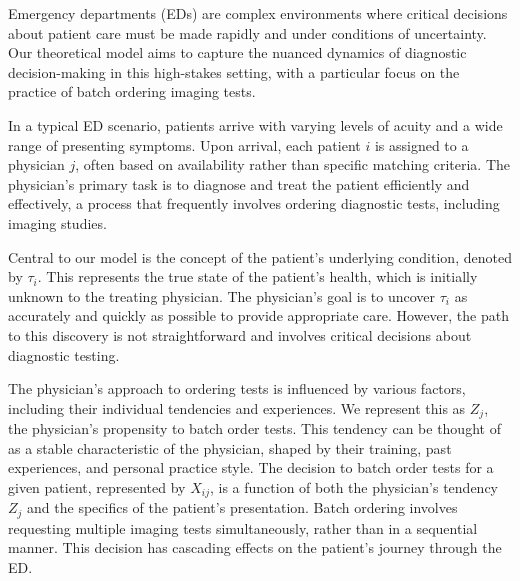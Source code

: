 \documentclass{article}
\begin{document}
Emergency departments (EDs) are complex environments where critical
decisions about patient care must be made rapidly and under conditions
of uncertainty. Our theoretical model aims to capture the nuanced
dynamics of diagnostic decision-making in this high-stakes setting, with
a particular focus on the practice of batch ordering imaging tests.

In a typical ED scenario, patients arrive with varying levels of acuity
and a wide range of presenting symptoms. Upon arrival, each patient
\(i\) is assigned to a physician \(j\), often based on availability
rather than specific matching criteria. The physician's primary task is
to diagnose and treat the patient efficiently and effectively, a process
that frequently involves ordering diagnostic tests, including imaging
studies.

Central to our model is the concept of the patient's underlying
condition, denoted by \(\tau_i\). This represents the true state of the
patient's health, which is initially unknown to the treating physician.
The physician's goal is to uncover \(\tau_i\) as accurately and quickly
as possible to provide appropriate care. However, the path to this
discovery is not straightforward and involves critical decisions about
diagnostic testing.

The physician's approach to ordering tests is influenced by various
factors, including their individual tendencies and experiences. We
represent this as \(Z_j\), the physician's propensity to batch order
tests. This tendency can be thought of as a stable characteristic of the
physician, shaped by their training, past experiences, and personal
practice style. The decision to batch order tests for a given patient,
represented by \(X_{ij}\), is a function of both the physician's
tendency \(Z_j\) and the specifics of the patient's presentation. Batch
ordering involves requesting multiple imaging tests simultaneously,
rather than in a sequential manner. This decision has cascading effects
on the patient's journey through the ED.
\end{document}

